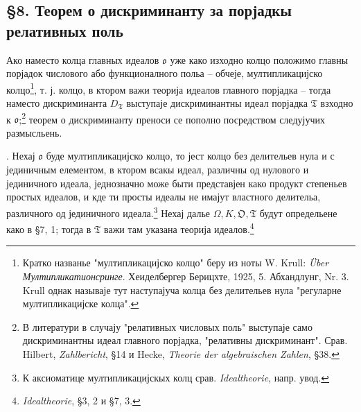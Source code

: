 \documentclass[11pt]{article}
\newcommand{\mo}{\mathfrak{o}}
\newcommand{\mO}{\mathfrak{O}}
\newcommand{\mT}{\mathfrak{T}}
\begin{document}
\setcounter{footnote}{29}

\subsection*{§8. Теорем о дискриминанту за порјадкы релативных поль}

\noindent Ако наместо колца главных идеалов $\mo$ уже како изходно колцо положимо главны порјадок числового або функционалного польа -- обчеје, мултипликацијско колцо\footnote{Кратко названье "мултипликацијско колцо" беру из ноты W. Krull: \emph{Über Мултипликатионсринге}. Хеиделбергер Берицхте, 1925, 5. Абхандлунг, Nr. 3. Krull однак называје тут наступајуча колца без делительев нула "регуларне мултипликацијске колца".}, т. ј. колцо, в ктором важи теорија идеалов главного порјадка -- тогда наместо дискриминанта $D_\mT$ выступаје дискриминантны идеал порјадка $\mT$ взходно к $\mo$;\footnote{В литератури в случају "релативных числовых поль" выступаје само дискриминантны идеал главного порјадка, "релативны дискриминант". Срав. Hilbert, \emph{Zahlbericht}, §14 и Hecke, \emph{Theorie der algebraischen Zahlen}, §38.} теорем о дискриминанту преноси се пополно посредством следујучих размысльень.

. Нехај $\mo$ буде мултипликацијско колцо, то јест колцо без делительев нула и с јединичным елементом, в ктором всакы идеал, различны од нулового и јединичного идеала, једнозначно може быти представјен како продукт степеньев простых идеалов, и кде ти просты идеалы не имајут властного делительа, различного од јединичного идеала.\footnote{К аксиоматице мултипликацијскых колц срав. \emph{Idealtheorie}, напр. увод.} Нехај далье $\Omega,K,\mO,\mT$ будут определьене како в §7, 1; тогда в $\mT$ важи там указана теорија идеалов.\footnote{\emph{Idealtheorie}, §3, 2 и §7, 3.}
\end{document}
